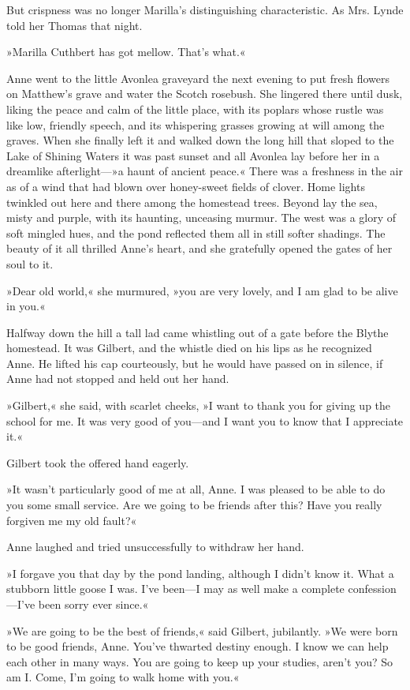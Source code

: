 But crispness was no longer Marilla's distinguishing characteristic. As Mrs. Lynde told her Thomas that night.

»Marilla Cuthbert has got mellow. That's what.«

Anne went to the little Avonlea graveyard the next evening to put fresh flowers on Matthew's grave and water the Scotch rosebush. She lingered there until dusk, liking the peace and calm of the little place, with its poplars whose rustle was like low, friendly speech, and its whispering grasses growing at will among the graves. When she finally left it and walked down the long hill that sloped to the Lake of Shining Waters it was past sunset and all Avonlea lay before her in a dreamlike afterlight—»a haunt of ancient peace.« There was a freshness in the air as of a wind that had blown over honey-sweet fields of clover. Home lights twinkled out here and there among the homestead trees. Beyond lay the sea, misty and purple, with its haunting, unceasing murmur. The west was a glory of soft mingled hues, and the pond reflected them all in still softer shadings. The beauty of it all thrilled Anne's heart, and she gratefully opened the gates of her soul to it.

»Dear old world,« she murmured, »you are very lovely, and I am glad to be alive in you.«

Halfway down the hill a tall lad came whistling out of a gate before the Blythe homestead. It was Gilbert, and the whistle died on his lips as he recognized Anne. He lifted his cap courteously, but he would have passed on in silence, if Anne had not stopped and held out her hand.

»Gilbert,« she said, with scarlet cheeks, »I want to thank you for giving up the school for me. It was very good of you—and I want you to know that I appreciate it.«

Gilbert took the offered hand eagerly.

»It wasn't particularly good of me at all, Anne. I was pleased to be able to do you some small service. Are we going to be friends after this? Have you really forgiven me my old fault?«

Anne laughed and tried unsuccessfully to withdraw her hand.

»I forgave you that day by the pond landing, although I didn't know it. What a stubborn little goose I was. I've been—I may as well make a complete confession—I've been sorry ever since.«

»We are going to be the best of friends,« said Gilbert, jubilantly. »We were born to be good friends, Anne. You've thwarted destiny enough. I know we can help each other in many ways. You are going to keep up your studies, aren't you? So am I. Come, I'm going to walk home with you.«

